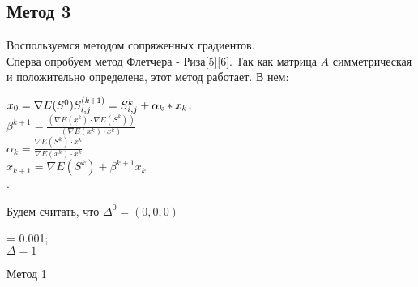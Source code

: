 \documentclass[ 12pt,x11names]{article}
\begin{document}
    \subsection{Метод 3}
    Воспользуемся методом сопряженных градиентов.\\
    Сперва опробуем метод Флетчера - Риза[5][6].
    Так как матрица $A$ симметрическая и положительно определена, этот метод работает.
    В нем:
    \begin{center}
    $ x_0= \nabla E(S^0)\\
    S^{(k + 1)}_{i, j} = S^{k}_{i, j} + \alpha_k * x_k $,\\
     $\beta ^{k +1} = \frac{ (\nabla E(x^k) \cdot \nabla E(S^k))} { (\nabla E(x^k) \cdot x^k)}$\\
    $\alpha_k =\frac{\nabla E(S^k) \cdot x^k}{\nabla E(x^k) \cdot x^k}$\\
    $x_{k + 1}= \nabla E(S^k) + \beta ^ {k + 1} x_k$\\
   .
    \end{center}
    Будем считать, что $\Delta^0=(0,0,0)$\\

    \begin{algorithm}[H]
		\SetAlgoLined
		\alpha = 0.001;\\
		$ \Delta  = 1$\\
	\caption{Метод 1}
    \end{algorithm}
\end{document}
